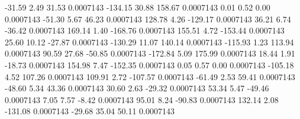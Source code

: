       -31.59        2.49       31.53     0.0007143
     -134.15       30.88      158.67     0.0007143
        0.01        0.52        0.00     0.0007143
      -51.30        5.67       46.23     0.0007143
      128.78        4.26     -129.17     0.0007143
       36.21        6.74      -36.42     0.0007143
      169.14        1.40     -168.76     0.0007143
      155.51        4.72     -153.44     0.0007143
       25.60       10.12      -27.87     0.0007143
     -130.29       11.07      140.14     0.0007143
     -115.93        1.23      113.94     0.0007143
       90.59       27.68      -50.85     0.0007143
     -172.84        5.09      175.99     0.0007143
       18.44        1.91      -18.73     0.0007143
      154.98        7.47     -152.35     0.0007143
        0.05        0.57        0.00     0.0007143
     -105.18        4.52      107.26     0.0007143
      109.91        2.72     -107.57     0.0007143
      -61.49        2.53       59.41     0.0007143
      -48.60        5.34       43.36     0.0007143
       30.60        2.63      -29.32     0.0007143
       53.34        5.47      -49.46     0.0007143
        7.05        7.57       -8.42     0.0007143
       95.01        8.24      -90.83     0.0007143
      132.14        2.08     -131.08     0.0007143
      -29.68       35.04       50.11     0.0007143
